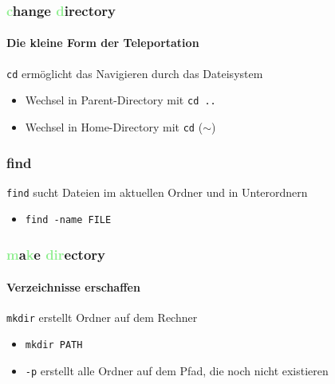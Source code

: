 \documentclass[12pt,utf8]{beamer}
\begin{document}
\begin{frame}
	\frametitle{\textcolor{lightGreen}{c}hange \textcolor{lightGreen}{d}irectory}
	\framesubtitle{Die kleine Form der Teleportation}
	\texttt{cd} ermöglicht das Navigieren durch das Dateisystem
	\begin{itemize}
		\item Wechsel in Parent-Directory mit \texttt{cd ..}
		\item Wechsel in Home-Directory mit \texttt{cd} ($\sim$)
	\end{itemize}
\end{frame}

\begin{frame}
	\frametitle{find}
	\texttt{find} sucht Dateien im aktuellen Ordner und in Unterordnern
	\begin{itemize}
		\item \texttt{find -name FILE}
	\end{itemize}
\end{frame}

\begin{frame}
\frametitle{\textcolor{lightGreen}{m}a\textcolor{lightGreen}{k}e \textcolor{lightGreen}{dir}ectory}
\framesubtitle{Verzeichnisse erschaffen}
\texttt{mkdir} erstellt Ordner auf dem Rechner
\begin{itemize}
	\item \texttt{mkdir PATH}
	\item \texttt{-p} erstellt alle Ordner auf dem Pfad, die noch nicht existieren
\end{itemize}
\end{frame}

\end{document}
